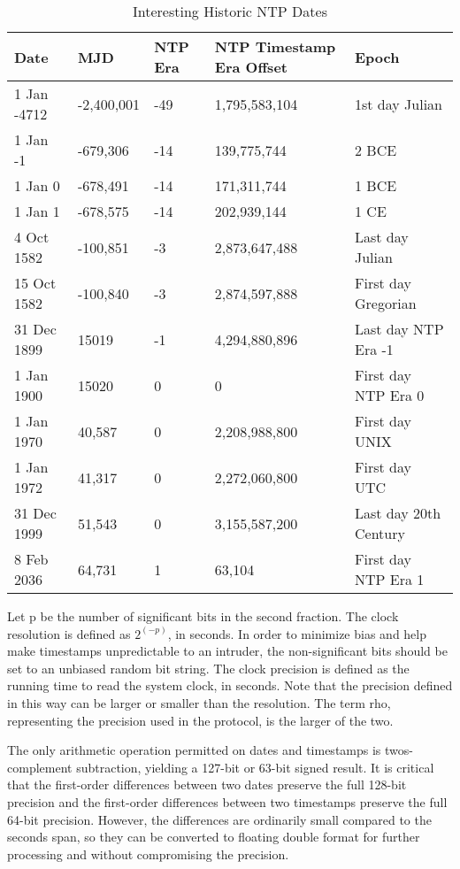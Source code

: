 \begin{table}[htb]
\center
\begin{tabular}{l | l | l | l | l}
Date & MJD & NTP Era & NTP Timestamp Era Offset & Epoch \\
\hline
\hline
1 Jan -4712 & -2,400,001 & -49 & 1,795,583,104 & 1st day Julian \\
1 Jan -1 & -679,306 & -14 & 139,775,744 & 2 BCE \\
1 Jan 0 & -678,491 & -14 & 171,311,744 & 1 BCE \\
1 Jan 1 & -678,575 & -14 & 202,939,144 & 1 CE \\
4 Oct 1582 & -100,851 & -3 & 2,873,647,488 & Last day Julian \\
15 Oct 1582 & -100,840 & -3 & 2,874,597,888 & First day Gregorian \\
31 Dec 1899 & 15019 & -1 & 4,294,880,896 & Last day NTP Era -1 \\
1 Jan 1900 & 15020 & 0 & 0 & First day NTP Era 0 \\
1 Jan 1970 & 40,587 & 0 & 2,208,988,800 & First day UNIX \\
1 Jan 1972 & 41,317 & 0 & 2,272,060,800 & First day UTC \\
31 Dec 1999 & 51,543 & 0 & 3,155,587,200 & Last day 20th Century \\
8 Feb 2036 & 64,731 & 1 & 63,104 & First day NTP Era 1 \\
\hline
\end{tabular}
\label{interesting_historic_ntp_dates}
\caption{Interesting Historic NTP Dates}
\end{table}

Let p be the number of significant bits in the second fraction. The
clock resolution is defined as $2^(-p)$, in seconds. In order to
minimize bias and help make timestamps unpredictable to an intruder,
the non-significant bits should be set to an unbiased random bit
string. The clock precision is defined as the running time to read
the system clock, in seconds. Note that the precision defined in
this way can be larger or smaller than the resolution. The term rho,
representing the precision used in the protocol, is the larger of the
two.

The only arithmetic operation permitted on dates and timestamps is
twos-complement subtraction, yielding a 127-bit or 63-bit signed
result. It is critical that the first-order differences between two
dates preserve the full 128-bit precision and the first-order
differences between two timestamps preserve the full 64-bit
precision. However, the differences are ordinarily small compared to
the seconds span, so they can be converted to floating double format
for further processing and without compromising the precision.

